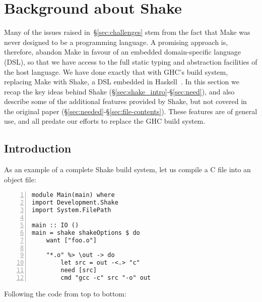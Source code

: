 \section{Background about Shake\label{sec:shake}}

Many of the issues raised in~\S\ref{sec:challenges} stem from the fact
that Make was never designed to be a programming language.  A
promising approach is, therefore, abandon Make in favour of an
embedded domain-specific language (DSL), so that we have access to the full
static typing and abstraction facilities of the host language.
We have done exactly that with GHC's build system, replacing Make with
Shake, a DSL embedded in Haskell~\cite{shake}. In this section we
recap the key ideas behind Shake (\S\ref{sec:shake_intro}-\S\ref{sec:need}), and
also describe some of the additional features provided by Shake, but not covered
in the original paper (\S\ref{sec:needed}-\S\ref{sec:file-contents}). These features
are of general use, and all predate our efforts to replace the GHC build system.

\subsection{Introduction\label{sec:shake_intro}}

As an example of a complete
Shake build system, let us compile a C file into an object file:

\begin{lstlisting}[numbers=left,xleftmargin=2em,framexleftmargin=1.5em]
module Main(main) where
import Development.Shake
import System.FilePath

main :: IO ()
main = shake shakeOptions $ do
    want ["foo.o"]

    "*.o" %> \out -> do
        let src = out -<.> "c"
        need [src]
        cmd "gcc -c" src "-o" out
\end{lstlisting}

\noindent Following the code from top to bottom:


